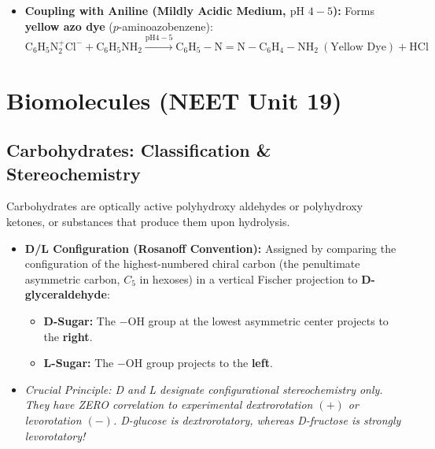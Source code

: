 \documentclass[10pt,a4paper]{article}
\begin{document}
\begin{formulabox}
\begin{itemize}
\begin{equation}
    \mathrm{C_6H_5N_2^+Cl^-} + \mathrm{C_6H_5OH} \xrightarrow{\mathrm{pH } 9-10} \mathbf{\mathrm{C_6H_5-N=N-C_6H_4-OH}} \ (\text{Orange Dye}) + \mathrm{HCl}
  \end{equation}
  \item \textbf{Coupling with Aniline (Mildly Acidic Medium, $\text{pH } 4-5$):} Forms \textbf{yellow azo dye} ($p$-aminoazobenzene):
  \begin{equation}
    \mathrm{C_6H_5N_2^+Cl^-} + \mathrm{C_6H_5NH_2} \xrightarrow{\mathrm{pH } 4-5} \mathbf{\mathrm{C_6H_5-N=N-C_6H_4-NH_2}} \ (\text{Yellow Dye}) + \mathrm{HCl}
  \end{equation}
\end{itemize}
\end{formulabox}

\section{Biomolecules (NEET Unit 19)}

\subsection{Carbohydrates: Classification \& Stereochemistry}

\begin{conceptbox}
Carbohydrates are optically active polyhydroxy aldehydes or polyhydroxy ketones, or substances that produce them upon hydrolysis.
\begin{itemize}
  \item \textbf{D/L Configuration (Rosanoff Convention):} Assigned by comparing the configuration of the highest-numbered chiral carbon (the penultimate asymmetric carbon, $C_5$ in hexoses) in a vertical Fischer projection to \textbf{D-glyceraldehyde}:
  \begin{itemize}
    \item \textbf{D-Sugar:} The $-\mathrm{OH}$ group at the lowest asymmetric center projects to the \textbf{right}.
    \item \textbf{L-Sugar:} The $-\mathrm{OH}$ group projects to the \textbf{left}.
  \end{itemize}
  \item \textit{Crucial Principle: D and L designate configurational stereochemistry only. They have ZERO correlation to experimental dextrorotation $(+)$ or levorotation $(-)$. D-glucose is dextrorotatory, whereas D-fructose is strongly levorotatory!}
\end{itemize}
\end{conceptbox}
\end{document}
